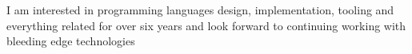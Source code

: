 I am interested in programming languages design, implementation, tooling and everything related for over six years and look forward to continuing working with bleeding edge technologies
